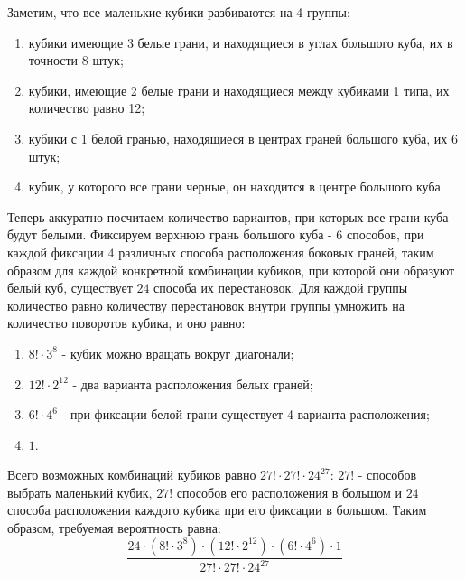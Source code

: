 \documentclass{article}
\begin{document}
Заметим, что все маленькие кубики разбиваются на 4 группы:
\begin{enumerate}
\item кубики имеющие 3 белые грани, и находящиеся в углах большого куба, их в точности 8 штук;
\item кубики, имеющие 2 белые грани и находящиеся между кубиками 1 типа, их количество равно 12;
\item кубики с 1 белой гранью, находящиеся в центрах граней большого куба, их 6 штук;
\item кубик, у которого все грани черные, он находится в центре большого куба.
\end{enumerate}
Теперь аккуратно посчитаем количество вариантов, при которых все грани куба будут белыми. Фиксируем верхнюю грань большого куба - $6$ способов, при каждой фиксации $4$ различных способа расположения боковых граней, таким образом для каждой конкретной комбинации кубиков, при которой они образуют белый куб, существует $24$ способа их перестановок. Для каждой группы количество равно количеству перестановок внутри группы умножить на количество поворотов кубика, и оно равно:
\begin{enumerate}
\item $8!\cdot3^8$ - кубик можно вращать вокруг диагонали;
\item $12!\cdot2^{12}$ - два варианта расположения белых граней;
\item $6!\cdot4^6$ - при фиксации белой грани существует 4 варианта расположения;
\item $1$.
\end{enumerate}
Всего возможных комбинаций кубиков равно $27!\cdot27!\cdot{24}^{27}$: $27!$ - способов выбрать маленький кубик, $27!$ способов его расположения в большом и $24$ способа расположения каждого кубика при его фиксации в большом.
Таким образом, требуемая вероятность равна: $$\frac{24\cdot (8!\cdot3^8) \cdot (12!\cdot2^{12}) \cdot (6!\cdot4^6) \cdot 1}{27!\cdot27!\cdot{24}^{27}}$$
\end{document}
